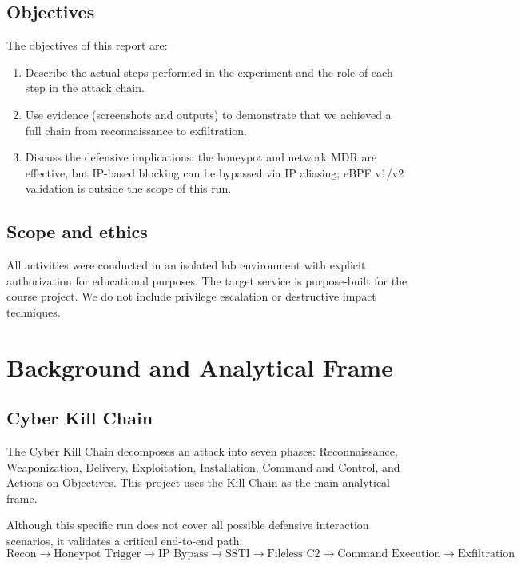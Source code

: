 \documentclass[11pt]{article}
\begin{document}
\subsection{Objectives}
The objectives of this report are:
\begin{enumerate}[leftmargin=*]
  \item Describe the actual steps performed in the experiment and the role of each step in the attack chain.
  \item Use evidence (screenshots and outputs) to demonstrate that we achieved a full chain from reconnaissance to exfiltration.
  \item Discuss the defensive implications: the honeypot and network MDR are effective, but IP-based blocking can be bypassed via IP aliasing; eBPF v1/v2 validation is outside the scope of this run.
\end{enumerate}

\subsection{Scope and ethics}
All activities were conducted in an isolated lab environment with explicit authorization for educational purposes. The target service is purpose-built for the course project. We do not include privilege escalation or destructive impact techniques.

\section{Background and Analytical Frame}

\subsection{Cyber Kill Chain}
The Cyber Kill Chain decomposes an attack into seven phases: Reconnaissance, Weaponization, Delivery, Exploitation, Installation, Command and Control, and Actions on Objectives. This project uses the Kill Chain as the main analytical frame.

Although this specific run does not cover all possible defensive interaction scenarios, it validates a critical end-to-end path:
\[
\text{Recon} \rightarrow
\text{Honeypot Trigger} \rightarrow
\text{IP Bypass} \rightarrow
\text{SSTI} \rightarrow
\text{Fileless C2} \rightarrow
\text{Command Execution} \rightarrow
\text{Exfiltration}
\]
\end{document}
